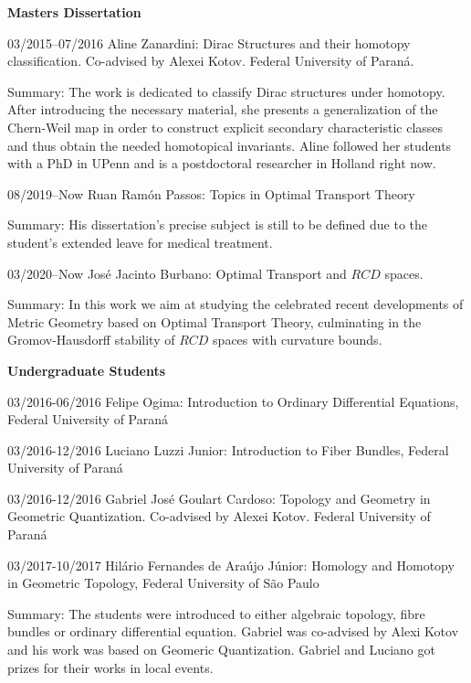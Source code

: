 \documentclass[10pt]{article}
\newenvironment{innerlist}[1][\enskip\textbullet]%
{\begin{compactitem}[#1]}{\end{compactitem}}
\newcommand{\blankline}{\quad\pagebreak[2]}
\begin{document}
	\hspace{-0.5cm}\textbf{Masters Dissertation}
	\begin{innerlist}
		
		
		\item[03/2015--07/2016] Aline Zanardini: Dirac Structures and their homotopy classification. Co-advised by Alexei Kotov. Federal University of Paraná. 
		
		Summary: The work is dedicated to classify  Dirac structures under homotopy. After introducing the necessary material, she presents a generalization of the Chern-Weil map in order to construct explicit secondary characteristic classes and thus obtain the needed homotopical invariants. Aline followed her students with a PhD in UPenn and is a postdoctoral researcher in Holland right now.
		
		
		\item[08/2019--Now] Ruan Ramón Passos: Topics in Optimal Transport Theory
		
		Summary: His dissertation's precise subject is still to be defined due to the student's extended leave for medical treatment.
		
		\item[03/2020--Now] José Jacinto Burbano: Optimal Transport and $RCD$ spaces.
		
		Summary: In this work we aim at studying the celebrated recent developments of Metric Geometry based on Optimal Transport Theory, culminating in the Gromov-Hausdorff stability of $RCD$ spaces with curvature bounds.
		
		
	\end{innerlist}
	
	\blankline
	
	\vspace*{-1em}
	\textbf{Undergraduate Students}
	\begin{innerlist}
		\item[03/2016-06/2016] Felipe Ogima: Introduction to Ordinary Differential Equations, Federal University of Paraná
		\item[03/2016-12/2016] Luciano Luzzi Junior: Introduction to Fiber Bundles, Federal University of Paraná
		\item[03/2016-12/2016] Gabriel José Goulart Cardoso: Topology and Geometry in Geometric Quantization. Co-advised by Alexei Kotov. Federal University of Paraná
		\item[03/2017-10/2017]
		Hilário Fernandes de Araújo Júnior: Homology and Homotopy in Geometric Topology, Federal University of São Paulo
	\end{innerlist}
	Summary: The students were introduced to either algebraic topology, fibre bundles or ordinary differential equation. Gabriel was co-advised by Alexi Kotov and his work was based on Geomeric Quantization. Gabriel and Luciano got prizes for their works in local events.
	
\end{document}
